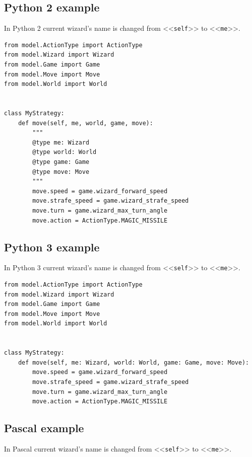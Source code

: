 \newpage
\subsection{Python 2 example}

In Python 2 current wizard's name is changed from <<\texttt{self}>> to <<\texttt{me}>>.

\begin{verbatim}
from model.ActionType import ActionType
from model.Wizard import Wizard
from model.Game import Game
from model.Move import Move
from model.World import World


class MyStrategy:
    def move(self, me, world, game, move):
        """
        @type me: Wizard
        @type world: World
        @type game: Game
        @type move: Move
        """
        move.speed = game.wizard_forward_speed
        move.strafe_speed = game.wizard_strafe_speed
        move.turn = game.wizard_max_turn_angle
        move.action = ActionType.MAGIC_MISSILE
\end{verbatim}

\subsection{Python 3 example}

In Python 3 current wizard's name is changed from <<\texttt{self}>> to <<\texttt{me}>>.

\begin{verbatim}
from model.ActionType import ActionType
from model.Wizard import Wizard
from model.Game import Game
from model.Move import Move
from model.World import World


class MyStrategy:
    def move(self, me: Wizard, world: World, game: Game, move: Move):
        move.speed = game.wizard_forward_speed
        move.strafe_speed = game.wizard_strafe_speed
        move.turn = game.wizard_max_turn_angle
        move.action = ActionType.MAGIC_MISSILE
\end{verbatim}

\newpage
\subsection{Pascal example}

In Pascal current wizard's name is changed from <<\texttt{self}>> to <<\texttt{me}>>.

